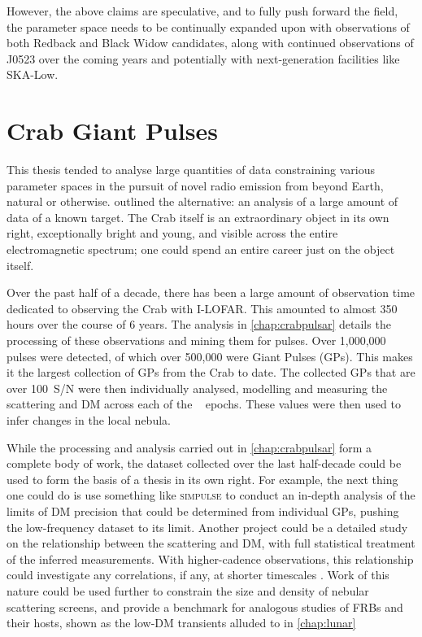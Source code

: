 However, the above claims are speculative, and to fully push forward the field, the parameter space needs to be continually expanded upon with observations of both Redback and Black Widow candidates, along with continued observations of J0523 over the coming years and potentially with next-generation facilities like SKA-Low. 


\section{Crab Giant Pulses}

This thesis tended to analyse large quantities of data constraining various parameter spaces in the pursuit of novel radio emission from beyond Earth, natural or otherwise.  outlined the alternative: an analysis of a large amount of data of a known target. The Crab itself is an extraordinary object in its own right, exceptionally bright and young, and visible across the entire electromagnetic spectrum; one could spend an entire career just on the object itself. 

Over the past half of a decade, there has been a large amount of observation time dedicated to observing the Crab with I-LOFAR. This amounted to almost 350 hours over the course of 6 years. The analysis in \cref{chap:crabpulsar} details the processing of these observations and mining them for pulses. Over 1,000,000 pulses were detected, of which over 500,000 were Giant Pulses (GPs). This makes it the largest collection of GPs from the Crab to date. The collected GPs that are over 100~S/N were then individually analysed, modelling and measuring the scattering and DM across each of the \epochs~ epochs. These values were then used to infer changes in the local nebula.

While the processing and analysis carried out in \cref{chap:crabpulsar} form a complete body of work, the dataset collected over the last half-decade could be used to form the basis of a thesis in its own right. For example, the next thing one could do is use something like \textsc{simpulse} to conduct an in-depth analysis of the limits of DM precision that could be determined from individual GPs, pushing the low-frequency dataset to its limit. Another project could be a detailed study on the relationship between the scattering and DM, with full statistical treatment of the inferred measurements. With higher-cadence observations, this relationship could investigate any correlations, if any, at shorter timescales \citep{kuzmin_correlation_2008}. Work of this nature could be used further to constrain the size and density of nebular scattering screens, and provide a benchmark for analogous studies of FRBs and their hosts, shown as the low-DM transients alluded to in \cref{chap:lunar}


